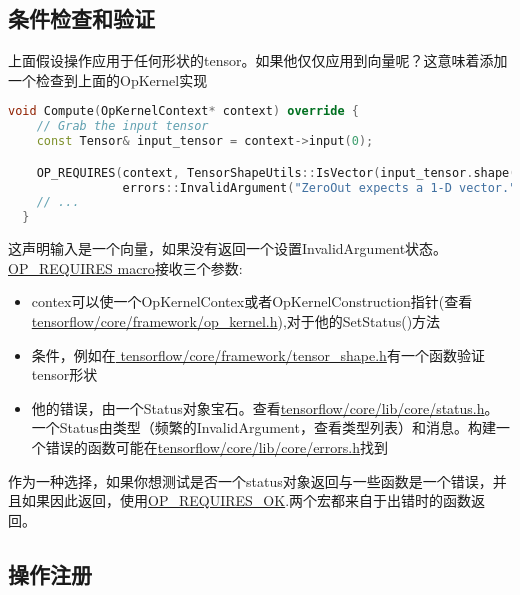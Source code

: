 \subsection{条件检查和验证}
上面假设操作应用于任何形状的tensor。如果他仅仅应用到向量呢？这意味着添加一个检查到上面的OpKernel实现
\begin{lstlisting}[language=C++]
  void Compute(OpKernelContext* context) override {
    // Grab the input tensor
    const Tensor& input_tensor = context->input(0);

    OP_REQUIRES(context, TensorShapeUtils::IsVector(input_tensor.shape()),
                errors::InvalidArgument("ZeroOut expects a 1-D vector."));
    // ...
  }

\end{lstlisting}
这声明输入是一个向量，如果没有返回一个设置InvalidArgument状态。\href{https://www.github.com/tensorflow/tensorflow/blob/r1.4/tensorflow/core/lib/core/errors.h}{OP\_REQUIRES macro}接收三个参数:
\begin{itemize}
\item contex可以使一个OpKernelContex或者OpKernelConstruction指针(查看\href{https://www.github.com/tensorflow/tensorflow/blob/r1.4/tensorflow/core/framework/op_kernel.h}{tensorflow/core/framework/op\_kernel.h}),对于他的SetStatus()方法
\item 条件，例如在\href{https://www.github.com/tensorflow/tensorflow/blob/r1.4/tensorflow/core/framework/tensor_shape.h}{ tensorflow/core/framework/tensor\_shape.h}有一个函数验证tensor形状
\item 他的错误，由一个Status对象宝石。查看\href{https://www.github.com/tensorflow/tensorflow/blob/r1.4/tensorflow/core/lib/core/status.h}{tensorflow/core/lib/core/status.h}。一个Status由类型（频繁的InvalidArgument，查看类型列表）和消息。构建一个错误的函数可能在\href{https://www.github.com/tensorflow/tensorflow/blob/r1.4/tensorflow/core/lib/core/errors.h}{tensorflow/core/lib/core/errors.h}找到
\end{itemize}
作为一种选择，如果你想测试是否一个status对象返回与一些函数是一个错误，并且如果因此返回，使用\href{https://www.github.com/tensorflow/tensorflow/blob/r1.4/tensorflow/core/lib/core/errors.h}{OP\_REQUIRES\_OK}.两个宏都来自于出错时的函数返回。
\subsection{操作注册}

